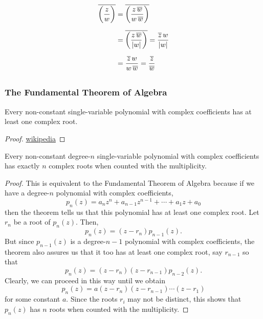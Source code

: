 \documentclass[../MathsNotesBase.tex]{subfiles}
\begin{document}
{		\[\begin{aligned}
			\overline{\left(\frac{z}{w}\right)} &= \overline{ \left(\frac{z \, \overline{w}}{w \, \overline{w}}\right) } \nn
			&= \overline{ \left(\frac{z \, \overline{w}}{\abs{w}}\right) } = \frac{\overline{z} \, w}{\abs{w}} \nn
			&= \frac{\overline{z} \, w}{w \, \overline{w}} = \frac{\overline{z}}{\overline{w}} \nn
		\end{aligned}\]
	
		\biggerskip
		\subsubsection{The Fundamental Theorem of Algebra}
		\begin{theorem}\label{theo:fundamental-theorem-of-algebra}
			Every non-constant single-variable polynomial with complex coefficients has at least one complex root.
		\end{theorem}
		\begin{proof}
			\href{https://en.wikipedia.org/wiki/Fundamental_theorem_of_algebra#Proofs}{wikipedia}
		\end{proof}
		\begin{corollary}
			Every non-constant degree-$n$ single-variable polynomial with complex coefficients has exactly $n$ complex roots when counted with the multiplicity.
		\end{corollary}
		\begin{proof}
			This is equivalent to the Fundamental Theorem of Algebra because if we have a degree-$n$ polynomial with complex coefficients,
			\[ p_n(z) = a_n z^n + a_{n-1} z^{n-1} + \cdots + a_1 z + a_0 \]
			then the theorem tells us that this polynomial has at least one complex root. Let $r_n$ be a root of $p_n(z)$. Then,
			\[ p_n(z) = (z - r_n)p_{n-1}(z). \]
			But since $p_{n-1}(z)$ is a degree-$n-1$ polynomial with complex coefficients, the theorem also assures us that it too has at least one complex root, say $r_{n-1}$ so that
			\[ p_n(z) = (z - r_n)(z - r_{n-1})p_{n-2}(z). \]
			Clearly, we can proceed in this way until we obtain
			\[ p_n(z) = a(z - r_n)(z - r_{n-1})\cdots(z - r_1) \]
			for some constant $a$. Since the roots $r_i$ may not be distinct, this shows that $p_n(z)$ has $n$ roots when counted with the multiplicity.
		\end{proof}
	}
		
		
\end{document}
